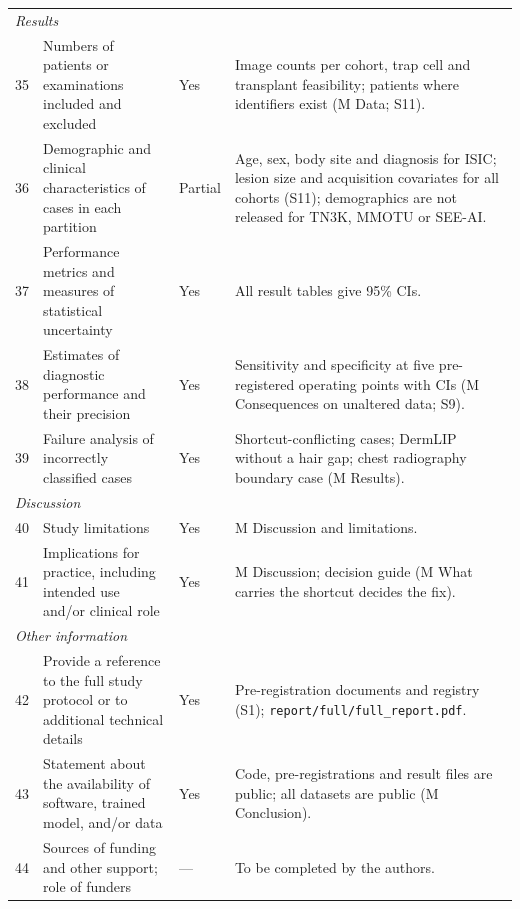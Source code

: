 {\begin{longtable}{p{0.4cm}p{6.2cm}p{0.9cm}p{7.3cm}}
\multicolumn{4}{l}{\emph{Results}}\\
35 & Numbers of patients or examinations included and excluded & Yes & Image counts per cohort, trap cell and transplant feasibility; patients where identifiers exist (M Data; S11). \\
36 & Demographic and clinical characteristics of cases in each partition & Partial & Age, sex, body site and diagnosis for ISIC; lesion size and acquisition covariates for all cohorts (S11); demographics are not released for TN3K, MMOTU or SEE-AI. \\
37 & Performance metrics and measures of statistical uncertainty & Yes & All result tables give 95\% CIs. \\
38 & Estimates of diagnostic performance and their precision & Yes & Sensitivity and specificity at five pre-registered operating points with CIs (M Consequences on unaltered data; S9). \\
39 & Failure analysis of incorrectly classified cases & Yes & Shortcut-conflicting cases; DermLIP without a hair gap; chest radiography boundary case (M Results). \\
\multicolumn{4}{l}{\emph{Discussion}}\\
40 & Study limitations & Yes & M Discussion and limitations. \\
41 & Implications for practice, including intended use and/or clinical role & Yes & M Discussion; decision guide (M What carries the shortcut decides the fix). \\
\multicolumn{4}{l}{\emph{Other information}}\\
42 & Provide a reference to the full study protocol or to additional technical details & Yes & Pre-registration documents and registry (S1); \texttt{report/full/full\_report.pdf}. \\
43 & Statement about the availability of software, trained model, and/or data & Yes & Code, pre-registrations and result files are public; all datasets are public (M Conclusion). \\
44 & Sources of funding and other support; role of funders & --- & To be completed by the authors. \\
\bottomrule
\end{longtable}}
